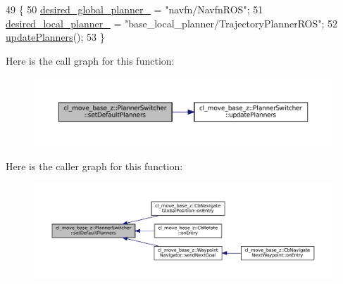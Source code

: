 \begin{DoxyCode}
49 \{
50   \hyperlink{classcl__move__base__z_1_1PlannerSwitcher_aef047d3778b2993c1df146bbad43e03d}{desired\_global\_planner\_} = \textcolor{stringliteral}{"navfn/NavfnROS"};
51   \hyperlink{classcl__move__base__z_1_1PlannerSwitcher_a6cbf65f11bb69125f913caaabdf7b4cf}{desired\_local\_planner\_} = \textcolor{stringliteral}{"base\_local\_planner/TrajectoryPlannerROS"};
52   \hyperlink{classcl__move__base__z_1_1PlannerSwitcher_a146641f63aea3185daab4c5cbb789550}{updatePlanners}();
53 \}
\end{DoxyCode}
Here is the call graph for this function\+:
\nopagebreak
\begin{figure}[H]
\begin{center}
\leavevmode
\includegraphics[width=350pt]{classcl__move__base__z_1_1PlannerSwitcher_ad3f0d08a51af6218d203bf44a7f9df40_cgraph}
\end{center}
\end{figure}
Here is the caller graph for this function\+:
\nopagebreak
\begin{figure}[H]
\begin{center}
\leavevmode
\includegraphics[width=350pt]{classcl__move__base__z_1_1PlannerSwitcher_ad3f0d08a51af6218d203bf44a7f9df40_icgraph}
\end{center}
\end{figure}
\mbox{\label{classcl__move__base__z_1_1PlannerSwitcher_a4bec9859c90f125f9fcc2b68594caf17}} 
